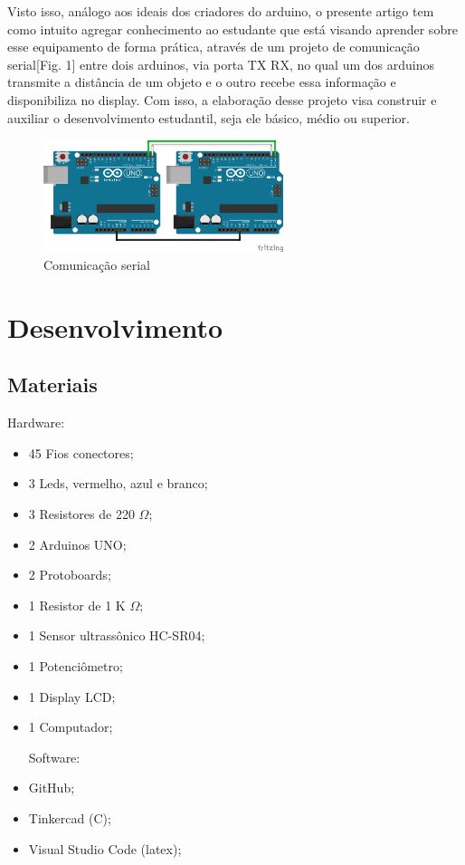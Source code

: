 \documentclass[conference]{IEEEtran}
\begin{document}
Visto isso, análogo aos ideais dos criadores do arduino, o presente artigo tem como intuito agregar conhecimento 
ao estudante que está visando aprender sobre esse equipamento de forma prática, através de um projeto de comunicação 
serial[Fig. 1] entre dois arduinos, via porta TX RX, no qual um dos arduinos transmite a distância de um objeto e o outro 
recebe  essa informação e disponibiliza no display. Com isso, a elaboração desse projeto visa construir e auxiliar o 
desenvolvimento estudantil, seja ele básico, médio ou superior.
\begin{figure}[htbp]
    \centerline{
        \includegraphics[width=7cm]{images/fig2.png}
        }
    \caption{Comunicação serial \cite{Acomunic15:online}}
    \label{figura:fig2}
    \end{figure}

\section{Desenvolvimento}

\subsection{Materiais}

Hardware:
\begin{itemize}
\item 45 Fios conectores;
\item 3 Leds, vermelho, azul e branco;
\item 3 Resistores de  220 $ \Omega  ; $
\item 2 Arduinos UNO;
\item 2 Protoboards;
\item 1 Resistor de 1 K $\Omega  ; $ 
\item 1 Sensor ultrassônico HC-SR04;
\item 1 Potenciômetro;
\item 1 Display LCD;
\item 1 Computador; 

Software:
\item GitHub;
\item Tinkercad (C); 
\item Visual Studio Code (latex);
\end{itemize}
\end{document}
